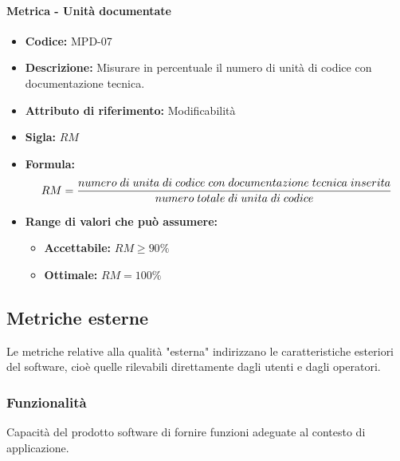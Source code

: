 \paragraph{Metrica - Unità documentate} 
   \begin{itemize}
          \item  \textbf{Codice:} MPD-07
         \item   \textbf{Descrizione:} Misurare in percentuale il numero di unità di codice con documentazione tecnica.
         \item   \textbf{Attributo di riferimento:} Modificabilità
         \item   \textbf{Sigla:} $RM$
         \item   \textbf{Formula:} $$RM = {numero \; di \; unita \; di \; codice \; con \; documentazione \; tecnica \; inserita \over numero \; totale \; di \; unita \; di \; codice}$$
   

        \item \textbf{Range di valori che può assumere:}
        \begin{itemize}
            \item \textbf{Accettabile:} $RM  \geq 90\%  $
            \item \textbf{Ottimale:} $RM = 100\%$
        \end{itemize}
       \end{itemize}
              
       
\subsection{Metriche esterne}
Le metriche relative alla qualità "esterna" indirizzano le caratteristiche esteriori del software, cioè quelle rilevabili direttamente dagli utenti e dagli operatori.
   \subsubsection{Funzionalità}
   Capacità del prodotto software di fornire funzioni adeguate al contesto di applicazione.
   
